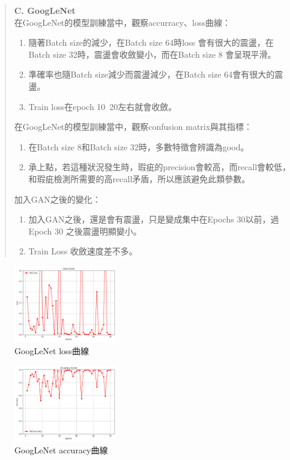 \begin{abstract}
    \noindent\textbf{C. GoogLeNet}\\
    在GoogLeNet的模型訓練當中，觀察accurracy、loss曲線：
    \begin{enumerate}
        \item 隨著Batch size的減少，在Batch size 64時loss 會有很大的震盪，在Batch size 32時，震盪會收斂變小，而在Batch size 8 會呈現平滑。
        \item 準確率也隨Batch size減少而震盪減少，在Batch size 64會有很大的震盪。
        \item Train loss在epoch 10~20左右就會收斂。
    \end{enumerate}
    在GoogLeNet的模型訓練當中，觀察confusion matrix與其指標：
    \begin{enumerate}
        \item 在Batch size 8和Batch size 32時，多數特徵會辨識為good。
        \item 承上點，若這種狀況發生時，瑕疵的precision會較高，而recall會較低，和瑕疵檢測所需要的高recall矛盾，所以應該避免此類參數。
    \end{enumerate}
    加入GAN之後的變化：
    \begin{enumerate}
        \item 加入GAN之後，還是會有震盪，只是變成集中在Epochs 30以前，過Epoch 30 之後震盪明顯變小。
        \item Train Loss 收斂速度差不多。
    \end{enumerate}
\end{abstract}
%
\begin{figure}[H]
    \centering
    \includegraphics[width=0.40\textwidth]{./img/GoogLeNet/P1.png}
    \caption{GoogLeNet loss曲線}
    \label{fig:GoogLeNet_P1}
\end{figure}
\begin{figure}[H]
    \centering
    \includegraphics[width=0.40\textwidth]{./img/GoogLeNet/P2.png}
    \caption{GoogLeNet accuracy曲線}
    \label{fig:GoogLeNet_P2}
\end{figure}
%
\FloatBarrier

